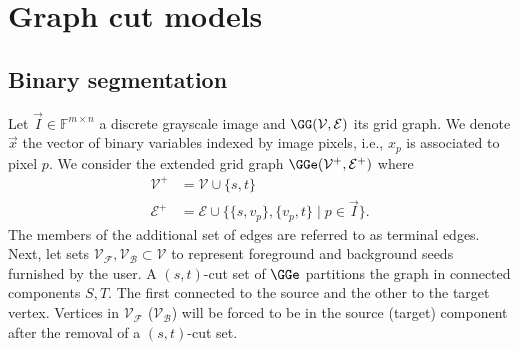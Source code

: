 \section{Graph cut models}
\label{ch2:sec:graph-cut-models}


\subsection{Binary segmentation}

Let $\vec{I} \in \mathbb{F}^{m\times n}$ a discrete grayscale image and $\GG (\mathcal{V},\mathcal{E})$ its grid graph. We denote $\vec{x}$ the vector of binary variables indexed by image pixels, i.e., $x_p$ is associated to pixel $p$. We consider the extended grid graph $\GGe (\mathcal{V}^+,\mathcal{E}^+)$ where 
\begin{align*}
	\mathcal{V}^+ &= \mathcal{V} \cup \{s,t\} \\
	\mathcal{E}^+ &= \mathcal{E} \cup \big\{ \{s,v_p\}, \{v_p,t\} \; | \; p \in \vec{I} \big\}.
\end{align*}
The members of the additional set of edges are referred to as terminal edges. Next, let sets $\mathcal{V_F}, \mathcal{V_B} \subset \mathcal{V}$ to represent foreground and background seeds furnished by the user. A $(s,t)$-cut set of $\GGe$ partitions the graph in connected components $S,T$. The first connected to the source and the other to the target vertex. Vertices in $\mathcal{V_F}$ ($\mathcal{V_B}$) will be forced to be in the source (target) component after the removal of a $(s,t)$-cut set.

